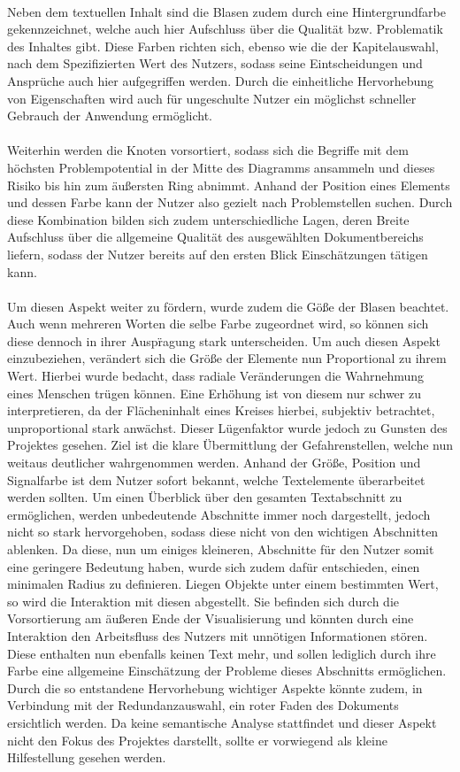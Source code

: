 \\
Neben dem textuellen Inhalt sind die Blasen zudem durch eine Hintergrundfarbe gekennzeichnet, welche auch hier Aufschluss \"uber die Qualit\"at bzw. Problematik des Inhaltes gibt. Diese Farben richten sich, ebenso wie die der Kapitelauswahl, nach dem Spezifizierten Wert des Nutzers, sodass seine Eintscheidungen und Anspr\"uche auch hier aufgegriffen werden. Durch die einheitliche Hervorhebung von Eigenschaften wird auch f\"ur ungeschulte Nutzer ein m\"oglichst schneller Gebrauch der Anwendung erm\"oglicht.\\
\\
Weiterhin werden die Knoten vorsortiert, sodass sich die Begriffe mit dem h\"ochsten Problempotential in der Mitte des Diagramms ansammeln und dieses Risiko bis hin zum \"au{\ss}ersten Ring abnimmt. Anhand der Position eines Elements und dessen Farbe kann der Nutzer also gezielt nach Problemstellen suchen. Durch diese Kombination  bilden sich zudem unterschiedliche Lagen, deren Breite Aufschluss \"uber die allgemeine Qualit\"at des ausgew\"ahlten Dokumentbereichs liefern, sodass der Nutzer bereits auf den ersten Blick Einsch\"atzungen t\"atigen kann.\\
\\
Um diesen Aspekt weiter zu f\"ordern, wurde zudem die G\"o{\ss}e der Blasen beachtet. Auch wenn mehreren Worten die selbe Farbe zugeordnet wird, so k\"onnen sich diese dennoch in ihrer Ausp\"ragung stark unterscheiden. Um auch diesen Aspekt einzubeziehen, ver\"andert sich die Gr\"o{\ss}e der Elemente nun Proportional zu ihrem Wert. Hierbei wurde bedacht, dass radiale Ver\"anderungen die Wahrnehmung eines Menschen tr\"ugen k\"onnen. Eine Erh\"öhung ist von diesem nur schwer zu interpretieren, da der Fl\"acheninhalt eines Kreises hierbei, subjektiv betrachtet, unproportional stark anw\"achst. Dieser L\"ugenfaktor wurde jedoch zu Gunsten des Projektes gesehen. Ziel ist die klare \"Ubermittlung der Gefahrenstellen, welche nun weitaus deutlicher wahrgenommen werden. Anhand der Gr\"o{\ss}e, Position und Signalfarbe ist dem Nutzer sofort bekannt, welche Textelemente \"uberarbeitet werden sollten. Um einen \"Uberblick \"uber den gesamten Textabschnitt zu erm\"oglichen, werden unbedeutende Abschnitte immer noch dargestellt, jedoch nicht so stark hervorgehoben, sodass diese nicht von den wichtigen Abschnitten ablenken. Da diese, nun um einiges kleineren, Abschnitte f\"ur den Nutzer somit eine geringere Bedeutung haben, wurde sich zudem daf\"ur entschieden, einen minimalen Radius zu definieren. Liegen Objekte unter einem bestimmten Wert, so wird die Interaktion mit diesen abgestellt. Sie befinden sich durch die Vorsortierung am \"au{\ss}eren Ende der Visualisierung und k\"onnten durch eine Interaktion den Arbeitsfluss des Nutzers mit unn\"otigen Informationen st\"oren. Diese enthalten nun ebenfalls keinen Text mehr, und sollen lediglich durch ihre Farbe eine allgemeine Einsch\"atzung der Probleme dieses Abschnitts erm\"oglichen. Durch die so entstandene Hervorhebung wichtiger Aspekte k\"onnte zudem, in Verbindung mit der Redundanzauswahl, ein roter Faden des Dokuments ersichtlich werden. Da keine semantische Analyse stattfindet und dieser Aspekt nicht den Fokus des Projektes darstellt, sollte er vorwiegend als kleine Hilfestellung gesehen werden.\\
